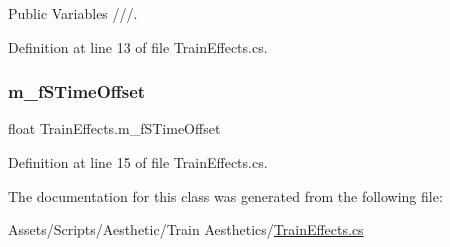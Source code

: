 Public Variables ///. 



Definition at line 13 of file Train\+Effects.\+cs.

\mbox{\label{class_train_effects_a556edd33d84615059499b6ba1542a958}} 
\subsubsection{\texorpdfstring{m\+\_\+f\+S\+Time\+Offset}{m\_fSTimeOffset}}
{\footnotesize\ttfamily float Train\+Effects.\+m\+\_\+f\+S\+Time\+Offset\hspace{0.3cm}{\ttfamily [static]}}



Definition at line 15 of file Train\+Effects.\+cs.



The documentation for this class was generated from the following file\+:\begin{DoxyCompactItemize}
\item 
Assets/\+Scripts/\+Aesthetic/\+Train Aesthetics/\mbox{\hyperlink{_train_effects_8cs}{Train\+Effects.\+cs}}\end{DoxyCompactItemize}
